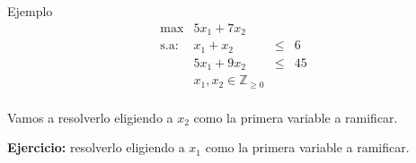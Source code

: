 \documentclass[10pt, aspectratio=169]{beamer}
\begin{document}
	


\begin{frame}{Ejemplo}
	$$
	\begin{matrix}
	 \max		 & 5x_1 + 7x_2 &          \\ 
	 \text{s.a:} & x_1 + x_2   & \leq & 6  \\      
				 & 5x_1 + 9x_2 & \leq & 45 \\
 				 & x_1,x_2 \in \mathbb{Z}_{\geq 0}&  & \\
	\end{matrix}
	$$

    Vamos a resolverlo eligiendo a $x_2$ como la primera variable a ramificar.
    
    \textbf{Ejercicio:} resolverlo eligiendo a $x_1$ como la primera variable a ramificar.
\end{frame}
\end{document}
